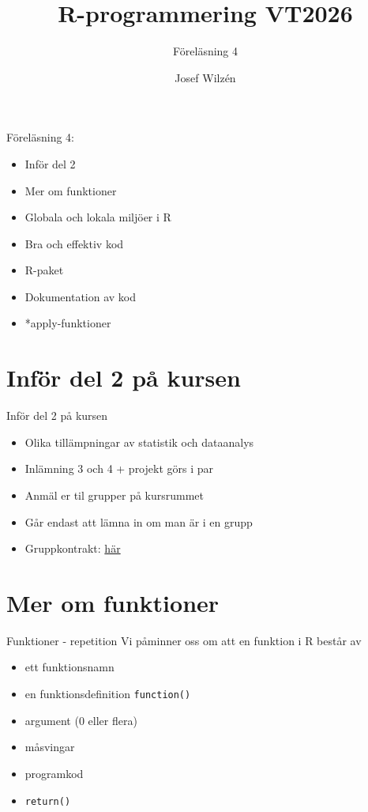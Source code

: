 \documentclass[
  11pt,
  ignorenonframetext,
]{beamer}
\title{R-programmering VT2026}
\subtitle{Föreläsning 4}
\author{Josef Wilzén}
\date{}
\institute{Linköpings Universitet}
\providecommand{\tightlist}{%
  \setlength{\itemsep}{0pt}\setlength{\parskip}{0pt}}
\begin{document}
\frame{\titlepage}

\begin{frame}{Föreläsning 4:}
\label{fuxf6reluxe4sning-4}
\begin{itemize}
\tightlist
\item
  Inför del 2
\item
  Mer om funktioner
\item
  Globala och lokala miljöer i R
\item
  Bra och effektiv kod
\item
  R-paket
\item
  Dokumentation av kod
\item
  *apply-funktioner
\end{itemize}
\end{frame}

\section{Inför del 2 på kursen}\label{del2}

\begin{frame}{Inför del 2 på kursen}
\label{funktioner---repetition}

\begin{itemize}
\tightlist
\item
  Olika tillämpningar av statistik och dataanalys  
\item
  Inlämning 3 och 4 + projekt görs i par  
\item
  Anmäl er til grupper på kursrummet
\item
  Går endast att lämna in om man är i en grupp
\item
  Gruppkontrakt: \href{https://github.com/STIMALiU/KursRprgm2/tree/main/Labs/Group_contract}{här}

\end{itemize}
\end{frame}



\section{Mer om funktioner}\label{mer-om-funktioner}

\begin{frame}{Funktioner - repetition}
\label{funktioner---repetition}
Vi påminner oss om att en funktion i R består av

\begin{itemize}
\tightlist
\item
  ett funktionsnamn
\item
  en funktionsdefinition \texttt{function()}
\item
  argument (0 eller flera)
\item
  måsvingar
\item
  programkod
\item
  \texttt{return()}
\end{itemize}
\end{frame}
\end{document}
